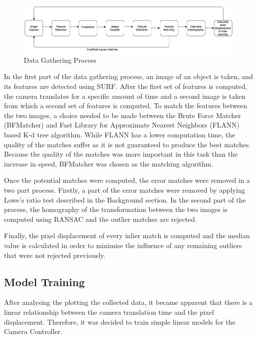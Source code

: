 \documentclass{l4proj}
\begin{document}
\begin{figure}[ht]
    \centering
    \includegraphics[width=1\textwidth]{l4template-master/images/dataGathering.png}
    \caption{Data Gathering Process}
    \label{datagathering}
\end{figure}


In the first part of the data gathering process, an image of an object is taken, and its features are detected using SURF. After the first set of features is computed, the camera translates for a specific amount of time and a second image is taken from which a second set of features is computed. To match the features between the two images, a choice needed to be made between the Brute Force Matcher (BFMatcher) and Fast Library for Approximate Nearest Neighbors (FLANN) based K-d tree algorithm. While FLANN has a lower computation time, the quality of the matches suffer as it is not guaranteed to produce the best matches. Because the quality of the matches was more important in this task than the increase in speed, BFMatcher was chosen as the matching algorithm. 

Once the potential matches were computed, the error matches were removed in a two part process. Firstly, a part of the error matches were removed by applying Lowe's ratio test described in the Background section. In the second part of the process, the homography of the transformation between the two images is computed using RANSAC and the outlier matches are rejected. 

Finally, the pixel displacement of every inlier match is computed and the median value is calculated in order to minimise the influence of any remaining outliers that were not rejected previously.  


\subsection{Model Training}

After analysing the plotting the collected data, it became apparent that there is a linear relationship between the camera translation time and the pixel displacement. Therefore, it was decided to train simple linear models for the Camera Controller. 
\end{document}
